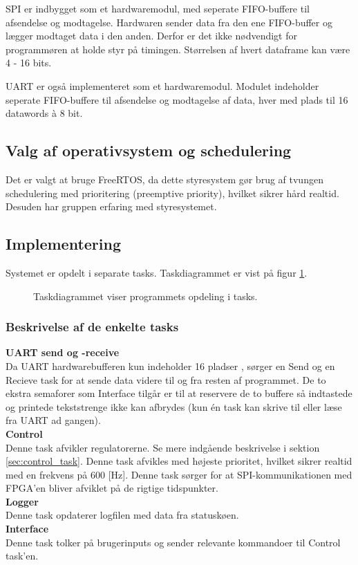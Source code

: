 SPI er indbygget som et hardwaremodul, 
med seperate FIFO-buffere til afsendelse og modtagelse. 
Hardwaren sender data fra den ene FIFO-buffer og 
lægger modtaget data i den anden. 
Derfor er det ikke nødvendigt for programmøren at holde styr på timingen. 
Størrelsen af hvert dataframe kan være 4 - 16 bits. 

UART er også implementeret som et hardwaremodul. 
Modulet indeholder seperate FIFO-buffere til afsendelse og modtagelse af data, hver med plads til 16 datawords à 8 bit. 

\subsection{Valg af operativsystem og schedulering}
Det er valgt at bruge FreeRTOS, da dette styresystem gør brug af tvungen schedulering med prioritering (preemptive priority), hvilket sikrer hård realtid.
Desuden har gruppen erfaring med styresystemet.

\subsection{Implementering}
Systemet er opdelt i separate tasks.
Taskdiagrammet er vist på figur \ref{fig:task_diagram}. 

\begin{figure}[!h]
\centering
\begin{tikzpicture}[node distance = 3.2cm]
	
\end{tikzpicture}
\caption[Taskdiagram]{Taskdiagrammet viser programmets opdeling i tasks.}
\label{fig:task_diagram}
\end{figure}

\subsubsection{Beskrivelse af de enkelte tasks}
	\textbf{UART send og -receive}\\ 
	Da UART hardwarebufferen kun indeholder 16 pladser \citep[Side. 430]{lm3s6965},
	sørger en Send og en Recieve task for at sende data videre til og fra resten af programmet.
	De to ekstra semaforer som Interface tilgår er til at reservere de to buffere så indtastede og
	printede tekststrenge ikke kan afbrydes (kun én task kan skrive til eller læse fra UART ad gangen).\\
	\textbf{Control}\\ 
	Denne task afvikler regulatorerne. Se mere indgående beskrivelse i sektion \ref{sec:control_task}.
	Denne task afvikles med højeste prioritet, hvilket sikrer realtid med en frekvens på 600 [Hz]. 
	Denne task sørger for at SPI-kommunikationen med FPGA'en bliver afviklet på de rigtige tidspunkter.\\
	\textbf{Logger}\\ 
	Denne task opdaterer logfilen med data fra statuskøen.\\
	\textbf{Interface}\\ 
	Denne task tolker på brugerinputs og sender relevante kommandoer til Control task'en.

